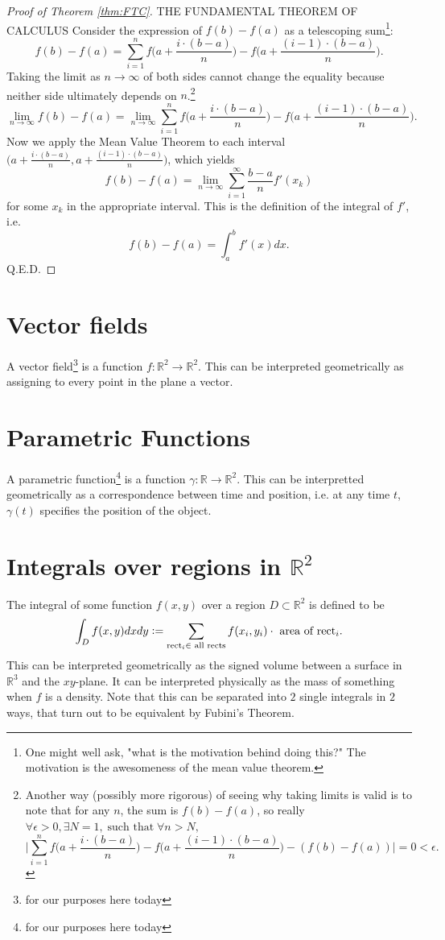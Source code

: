 \documentclass{article}[11pt]
\DeclareMathOperator{\st}{\text{ such that }}
\newcommand{\defeq}{\vcentcolon=}
\begin{document}
\begin{proof}[Proof of Theorem \ref{thm:FTC}]{THE FUNDAMENTAL THEOREM OF CALCULUS}
	Consider the expression of $f(b)-f(a)$ as a telescoping sum\footnote{One might well ask, "what is the motivation behind doing this?" The motivation is the awesomeness of the mean value theorem.}:
	$$f(b)-f(a) = \sum_{i=1}^n f\Big(a + \frac{i\cdot(b-a)}{n}\Big)-f\Big(a+\frac{(i-1)\cdot(b-a)}{n}\Big).$$
	Taking the limit as $n\to \infty$ of both sides cannot change the equality because neither side ultimately depends on $n$.\footnote{Another way (possibly more rigorous) of seeing why taking limits is valid is to note that for any $n$, the sum is $f(b) - f(a)$, so really $\forall \epsilon > 0, \exists N = 1, \st \forall n>N,$ $$\Big|\sum_{i=1}^n f\Big(a + \frac{i\cdot(b-a)}{n}\Big)-f\Big(a+\frac{(i-1)\cdot(b-a)}{n}\Big) - (f(b) - f(a))\Big| = 0 < \epsilon.$$}
	$$\lim_{n\to\infty}f(b)-f(a) = \lim_{n\to\infty}\sum_{i=1}^n f\Big(a + \frac{i\cdot(b-a)}{n}\Big)-f\Big(a+\frac{(i-1)\cdot(b-a)}{n}\Big).$$
	Now we apply the Mean Value Theorem to each interval $\Big(a + \frac{i\cdot(b-a)}{n},a+\frac{(i-1)\cdot(b-a)}{n}\Big)$, which yields
	$$f(b)-f(a) = \lim_{n\to\infty} \sum_{i=1}^\infty \frac{b-a}{n}f'(x_k)$$
	for some $x_k$ in the appropriate interval.
	This is the definition of the integral of $f'$, i.e. 
	$$f(b) - f(a) = \int_a^b f'(x) dx.$$
	\Huge{Q.E.D.}
\end{proof}

\section{Vector fields}
A vector field\footnote{for our purposes here today} is a function $f: \mathbb{R}^2 \to \mathbb{R}^2$.
This can be interpreted geometrically as assigning to every point in the plane a vector.

\section{Parametric Functions}
A parametric function\footnote{for our purposes here today} is a function $\gamma : \mathbb{R} \to \mathbb{R}^2$.
This can be interpretted geometrically as a correspondence between time and position, i.e. at any time $t$, $\gamma(t)$ specifies the position of the object.

\section{Integrals over regions in $\mathbb{R}^2$ }
The integral of some function $f(x, y)$ over a region $ D \subset \mathbb{R}^2$ is defined to be 
$$\int_D f(x,y) dx dy \defeq \sum_{\text{rect}_i \in \text{ all rects}}f(x_i, y_i) \cdot \text { area of rect}_i.$$
This can be interpreted geometrically as the signed volume between a surface in $\mathbb{R}^3$ and the $xy$-plane.
It can be interpreted physically as the mass of something when $f$ is a density.
Note that this can be separated into $2$ single integrals in $2$ ways, that turn out to be equivalent by Fubini's Theorem.
\end{document}
